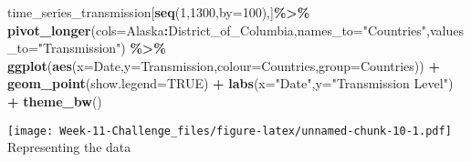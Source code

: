\documentclass[
]{article}
\newenvironment{Shaded}{\begin{snugshade}}{\end{snugshade}}
\newcommand{\AttributeTok}[1]{\textcolor[rgb]{0.13,0.29,0.53}{#1}}
\newcommand{\ConstantTok}[1]{\textcolor[rgb]{0.56,0.35,0.01}{#1}}
\newcommand{\DecValTok}[1]{\textcolor[rgb]{0.00,0.00,0.81}{#1}}
\newcommand{\FunctionTok}[1]{\textcolor[rgb]{0.13,0.29,0.53}{\textbf{#1}}}
\newcommand{\NormalTok}[1]{#1}
\newcommand{\SpecialCharTok}[1]{\textcolor[rgb]{0.81,0.36,0.00}{\textbf{#1}}}
\newcommand{\StringTok}[1]{\textcolor[rgb]{0.31,0.60,0.02}{#1}}
\begin{document}
\begin{Shaded}
\begin{Highlighting}[]
\NormalTok{time\_series\_transmission[}\FunctionTok{seq}\NormalTok{(}\DecValTok{1}\NormalTok{,}\DecValTok{1300}\NormalTok{,}\AttributeTok{by=}\DecValTok{100}\NormalTok{),]}\SpecialCharTok{\%\textgreater{}\%}
  \FunctionTok{pivot\_longer}\NormalTok{(}\AttributeTok{cols=}\NormalTok{Alaska}\SpecialCharTok{:}\NormalTok{District\_of\_Columbia,}\AttributeTok{names\_to=}\StringTok{"Countries"}\NormalTok{,}\AttributeTok{values\_to=}\StringTok{"Transmission"}\NormalTok{) }\SpecialCharTok{\%\textgreater{}\%}
  \FunctionTok{ggplot}\NormalTok{(}\FunctionTok{aes}\NormalTok{(}\AttributeTok{x=}\NormalTok{Date,}\AttributeTok{y=}\NormalTok{Transmission,}\AttributeTok{colour=}\NormalTok{Countries,}\AttributeTok{group=}\NormalTok{Countries)) }\SpecialCharTok{+} 
  \FunctionTok{geom\_point}\NormalTok{(}\AttributeTok{show.legend=}\ConstantTok{TRUE}\NormalTok{) }\SpecialCharTok{+} 
  \FunctionTok{labs}\NormalTok{(}\AttributeTok{x=}\StringTok{"Date"}\NormalTok{,}\AttributeTok{y=}\StringTok{"Transmission Level"}\NormalTok{) }\SpecialCharTok{+}
  \FunctionTok{theme\_bw}\NormalTok{()}
\end{Highlighting}
\end{Shaded}

\texttt{[image: Week-11-Challenge\_files/figure-latex/unnamed-chunk-10-1.pdf]}
Representing the data
\end{document}
